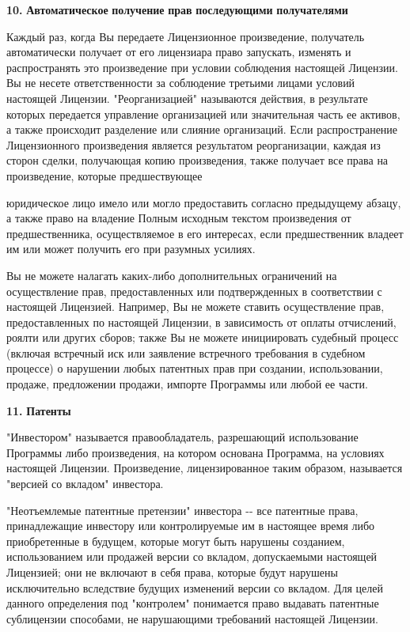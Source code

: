 {\bfseries{10.}} {\bfseries{Автоматическое}} {\bfseries{получение}} {\bfseries{прав}} {\bfseries{последующими}} {\bfseries{получателями}}

Каждый раз, когда Вы передаете Лицензионное произведение, получатель автоматически получает от его лицензиара право запускать, изменять и распространять это произведение при условии соблюдения настоящей Лицензии. Вы не несете ответственности за соблюдение третьими лицами условий настоящей Лицензии. "{}Реорганизацией"{} называются действия, в результате которых передается управление организацией или значительная часть ее активов, а также происходит разделение или слияние организаций. Если распространение Лицензионного произведения является результатом реорганизации, каждая из сторон сделки, получающая копию произведения, также получает все права на произведение, которые предшествующее

юридическое лицо имело или могло предоставить согласно предыдущему абзацу, а также право на владение Полным исходным текстом произведения от предшественника, осуществляемое в его интересах, если предшественник владеет им или может получить его при разумных усилиях.

Вы не можете налагать каких-\/либо дополнительных ограничений на осуществление прав, предоставленных или подтвержденных в соответствии с настоящей Лицензией. Например, Вы не можете ставить осуществление прав, предоставленных по настоящей Лицензии, в зависимость от оплаты отчислений, роялти или других сборов; также Вы не можете инициировать судебный процесс (включая встречный иск или заявление встречного требования в судебном процессе) о нарушении любых патентных прав при создании, использовании, продаже, предложении продажи, импорте Программы или любой ее части.

{\bfseries{11.}} {\bfseries{Патенты}}

"{}Инвестором"{} называется правообладатель, разрешающий использование Программы либо произведения, на котором основана Программа, на условиях настоящей Лицензии. Произведение, лицензированное таким образом, называется "{}версией со вкладом"{} инвестора.

"{}Неотъемлемые патентные претензии"{} инвестора -\/-\/ все патентные права, принадлежащие инвестору или контролируемые им в настоящее время либо приобретенные в будущем, которые могут быть нарушены созданием, использованием или продажей версии со вкладом, допускаемыми настоящей Лицензией; они не включают в себя права, которые будут нарушены исключительно вследствие будущих изменений версии со вкладом. Для целей данного определения под "{}контролем"{} понимается право выдавать патентные сублицензии способами, не нарушающими требований настоящей Лицензии.

